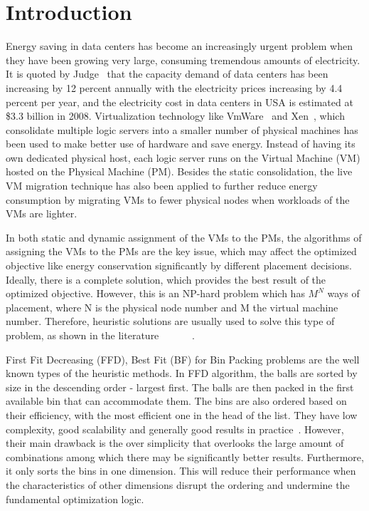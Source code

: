 \documentclass[10pt, conference, compsocconf]{IEEEtran}
\begin{document}
\section{Introduction}
Energy saving in data centers has become an increasingly urgent problem when
they have been growing very large, consuming tremendous amounts of
electricity. It is quoted by Judge~\cite{judge08} that the capacity demand of
data centers has been increasing by 12 percent annually with the electricity prices
increasing by 4.4 percent per year, and the electricity cost in data centers
in USA is estimated at \$3.3 billion in 2008. Virtualization technology like
VmWare~\cite{vmware01} and Xen~\cite{xen01}, which consolidate multiple logic
servers into a smaller number of physical machines has been used to make better
use of hardware and save energy. Instead of having its own dedicated physical host, each logic
server runs on the Virtual Machine (VM) hosted on the Physical Machine (PM).
Besides the static consolidation, the live VM migration technique has also been
applied to further reduce energy consumption by migrating VMs to fewer physical
nodes when workloads of the VMs are lighter.

In both static and dynamic assignment of the VMs to the PMs, the algorithms of
assigning the VMs to the PMs are the key issue, which may affect the optimized
objective like energy conservation significantly by different placement
decisions. Ideally, there is a complete solution, which provides the best result
of the optimized objective. However, this is an NP-hard problem which has
$M^{N}$ ways of placement, where N is the physical node number and M the virtual machine
number. Therefore, heuristic solutions are usually used to solve this type of
problem, as shown in the literature
~\cite{verma08}~\cite{verma09}~\cite{wood09}~\cite{kusic09}~\cite{stillwell10}~\cite{yao80}.

 First Fit Decreasing (FFD), Best Fit (BF) for Bin Packing problems are the
 well known types of the heuristic methods. In FFD algorithm, the balls are
 sorted by size in the descending order - largest first. The balls are then packed in the first
 available bin that can accommodate them. The bins are also ordered based on
 their efficiency, with the most efficient one in the head of the list. They
 have low complexity, good scalability and generally good results in
 practice~\cite{yao80}. However, their main drawback is the over simplicity that
 overlooks the large amount of combinations among which there may
 be significantly better results. Furthermore, it only sorts the bins in one
 dimension. This will reduce their performance when the characteristics of other dimensions disrupt the
 ordering and undermine the fundamental optimization logic.
\end{document}
